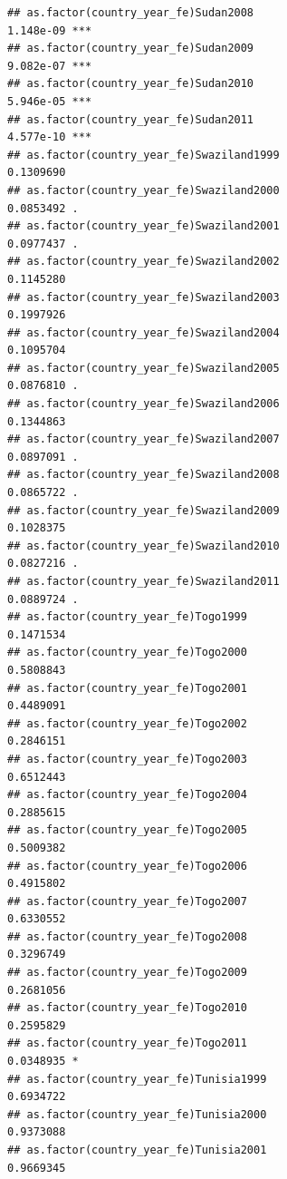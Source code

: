 \documentclass[
  a4paper,
]{article}
\begin{document}
\begin{verbatim}
## as.factor(country_year_fe)Sudan2008                            1.148e-09 ***
## as.factor(country_year_fe)Sudan2009                            9.082e-07 ***
## as.factor(country_year_fe)Sudan2010                            5.946e-05 ***
## as.factor(country_year_fe)Sudan2011                            4.577e-10 ***
## as.factor(country_year_fe)Swaziland1999                        0.1309690    
## as.factor(country_year_fe)Swaziland2000                        0.0853492 .  
## as.factor(country_year_fe)Swaziland2001                        0.0977437 .  
## as.factor(country_year_fe)Swaziland2002                        0.1145280    
## as.factor(country_year_fe)Swaziland2003                        0.1997926    
## as.factor(country_year_fe)Swaziland2004                        0.1095704    
## as.factor(country_year_fe)Swaziland2005                        0.0876810 .  
## as.factor(country_year_fe)Swaziland2006                        0.1344863    
## as.factor(country_year_fe)Swaziland2007                        0.0897091 .  
## as.factor(country_year_fe)Swaziland2008                        0.0865722 .  
## as.factor(country_year_fe)Swaziland2009                        0.1028375    
## as.factor(country_year_fe)Swaziland2010                        0.0827216 .  
## as.factor(country_year_fe)Swaziland2011                        0.0889724 .  
## as.factor(country_year_fe)Togo1999                             0.1471534    
## as.factor(country_year_fe)Togo2000                             0.5808843    
## as.factor(country_year_fe)Togo2001                             0.4489091    
## as.factor(country_year_fe)Togo2002                             0.2846151    
## as.factor(country_year_fe)Togo2003                             0.6512443    
## as.factor(country_year_fe)Togo2004                             0.2885615    
## as.factor(country_year_fe)Togo2005                             0.5009382    
## as.factor(country_year_fe)Togo2006                             0.4915802    
## as.factor(country_year_fe)Togo2007                             0.6330552    
## as.factor(country_year_fe)Togo2008                             0.3296749    
## as.factor(country_year_fe)Togo2009                             0.2681056    
## as.factor(country_year_fe)Togo2010                             0.2595829    
## as.factor(country_year_fe)Togo2011                             0.0348935 *  
## as.factor(country_year_fe)Tunisia1999                          0.6934722    
## as.factor(country_year_fe)Tunisia2000                          0.9373088    
## as.factor(country_year_fe)Tunisia2001                          0.9669345    

\end{verbatim}
\end{document}
